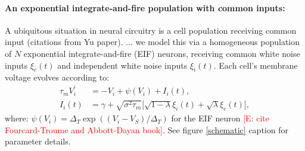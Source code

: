 \documentclass[%
 reprint,
 twocolumn,
 amsmath,amssymb,
 aps,
floatfix,
]{revtex4}
\newcommand{\Ecomment}[1]{\textcolor{red}{[E: #1]}}
\begin{document}
  


\bigskip

\noindent \paragraph*{An exponential integrate-and-fire population with common inputs:}

A ubiquitous situation in neural circuitry is a cell population receiving common input (citations from Yu paper). ... we model this via a homogeneous population of $N$ exponential integrate-and-fire (EIF) neurons, receiving common white noise inputs $\xi_c(t)$ and independent white noise inputs $\xi_i(t)$.  Each cell's membrane voltage evolves according to: 
\begin{align}
\label{eifsde}
\tau_m V_i^\prime &= -V_i +\psi(V_i)+I_i(t),\\
I_i(t) &= \gamma+\sqrt{\sigma^2\tau_m}\big[\sqrt{1-\lambda}\xi_i(t)+\sqrt{\lambda}\xi_c(t)\big] \nonumber,
\end{align}
where: $\psi(V_i) =\Delta_T \exp{\left((V_i - V_S)/\Delta_T\right)}$ for the EIF neuron \Ecomment{cite Fourcard-Troume and Abbott-Dayan book}.  See figure \ref{schematic} caption for parameter details.
\end{document}
